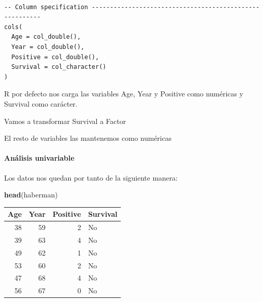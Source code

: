 \documentclass[
]{article}
\newenvironment{Shaded}{\begin{snugshade}}{\end{snugshade}}
\newcommand{\DataTypeTok}[1]{\textcolor[rgb]{0.13,0.29,0.53}{#1}}
\newcommand{\KeywordTok}[1]{\textcolor[rgb]{0.13,0.29,0.53}{\textbf{#1}}}
\newcommand{\NormalTok}[1]{#1}
\newcommand{\OperatorTok}[1]{\textcolor[rgb]{0.81,0.36,0.00}{\textbf{#1}}}
\newcommand{\StringTok}[1]{\textcolor[rgb]{0.31,0.60,0.02}{#1}}
\begin{document}
\begin{verbatim}

-- Column specification --------------------------------------------------------
cols(
  Age = col_double(),
  Year = col_double(),
  Positive = col_double(),
  Survival = col_character()
)
\end{verbatim}

R por defecto nos carga las variables Age, Year y Positive como
numéricas y Survival como carácter.

Vamos a transformar Survival a Factor

\begin{Shaded}
\end{Shaded}

El resto de variables las mantenemos como numéricas

\hypertarget{anuxe1lisis-univariable}{%
\paragraph{Análisis univariable}\label{anuxe1lisis-univariable}}

Los datos nos quedan por tanto de la siguiente manera:

\begin{Shaded}
\begin{Highlighting}[]
\KeywordTok{head}\NormalTok{(haberman)}
\end{Highlighting}
\end{Shaded}

\begin{tabular}{r|r|r|l}
\hline
Age & Year & Positive & Survival\\
\hline
38 & 59 & 2 & No\\
\hline
39 & 63 & 4 & No\\
\hline
49 & 62 & 1 & No\\
\hline
53 & 60 & 2 & No\\
\hline
47 & 68 & 4 & No\\
\hline
56 & 67 & 0 & No\\
\hline
\end{tabular}
\end{document}
